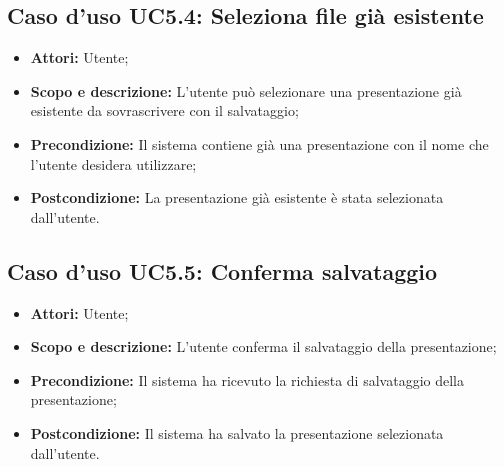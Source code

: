 \subsection{Caso d'uso UC5.4: Seleziona file già esistente}
\begin{itemize}
	\item \textbf{Attori:} Utente;
	\item \textbf{Scopo e descrizione:} L'utente può selezionare una presentazione già esistente da sovrascrivere con il salvataggio;
	\item \textbf{Precondizione:} Il sistema contiene già una presentazione con il nome che l'utente desidera utilizzare;
	\item \textbf{Postcondizione:} La presentazione già esistente è stata selezionata dall'utente.
\end{itemize}

\subsection{Caso d'uso UC5.5: Conferma salvataggio}
\begin{itemize}
	\item \textbf{Attori:} Utente;
	\item \textbf{Scopo e descrizione:} L'utente conferma il salvataggio della presentazione;
	\item \textbf{Precondizione:} Il sistema ha ricevuto la richiesta di salvataggio della presentazione;
	\item \textbf{Postcondizione:} Il sistema ha salvato la presentazione selezionata dall'utente.
\end{itemize}
\newpage